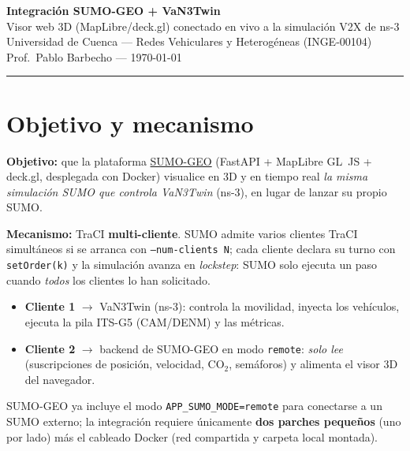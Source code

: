 \documentclass[11pt,a4paper]{article}
\begin{document}
\begin{center}
  {\color{azul}\LARGE\bfseries Integración SUMO-GEO + VaN3Twin}\\[4pt]
  {\color{gris}\large Visor web 3D (MapLibre/deck.gl) conectado en vivo a la simulación V2X de ns-3}\\[6pt]
  {\small Universidad de Cuenca --- Redes Vehiculares y Heterogéneas (INGE-00104)\\
  Prof.\ Pablo Barbecho --- \today}
\end{center}

\vspace{2pt}
\hrule
\vspace{8pt}

\tableofcontents

\section{Objetivo y mecanismo}

\textbf{Objetivo:} que la plataforma \href{https://github.com/Pbarbecho/SUMO_GEO}{SUMO-GEO}
(FastAPI + MapLibre GL~JS + deck.gl, desplegada con Docker) visualice en 3D y en tiempo
real \emph{la misma simulación SUMO que controla VaN3Twin} (ns-3), en lugar de lanzar su
propio SUMO.

\textbf{Mecanismo:} TraCI \textbf{multi-cliente}. SUMO admite varios clientes TraCI
simultáneos si se arranca con \texttt{--num-clients~N}; cada cliente declara su turno con
\texttt{setOrder(k)} y la simulación avanza en \emph{lockstep}: SUMO solo ejecuta un paso
cuando \emph{todos} los clientes lo han solicitado.

\begin{itemize}[leftmargin=1.4em]
  \item \textbf{Cliente 1} $\rightarrow$ VaN3Twin (ns-3): controla la movilidad, inyecta
        los vehículos, ejecuta la pila ITS-G5 (CAM/DENM) y las métricas.
  \item \textbf{Cliente 2} $\rightarrow$ backend de SUMO-GEO en modo \texttt{remote}:
        \emph{solo lee} (suscripciones de posición, velocidad, CO$_2$, semáforos) y
        alimenta el visor 3D del navegador.
\end{itemize}

SUMO-GEO ya incluye el modo \texttt{APP\_SUMO\_MODE=remote} para conectarse a un SUMO
externo; la integración requiere únicamente \textbf{dos parches pequeños} (uno por lado)
más el cableado Docker (red compartida y carpeta local montada).
\end{document}
